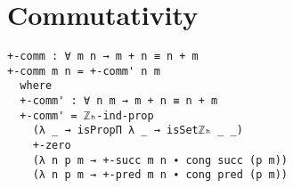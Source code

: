 \section{Commutativity}
\begin{verbatim}
+-comm : ∀ m n → m + n ≡ n + m
+-comm m n = +-comm' n m
  where
  +-comm' : ∀ n m → m + n ≡ n + m
  +-comm' = ℤₕ-ind-prop
    (λ _ → isPropΠ λ _ → isSetℤₕ _ _)
    +-zero
    (λ n p m → +-succ m n ∙ cong succ (p m))
    (λ n p m → +-pred m n ∙ cong pred (p m))
\end{verbatim}
